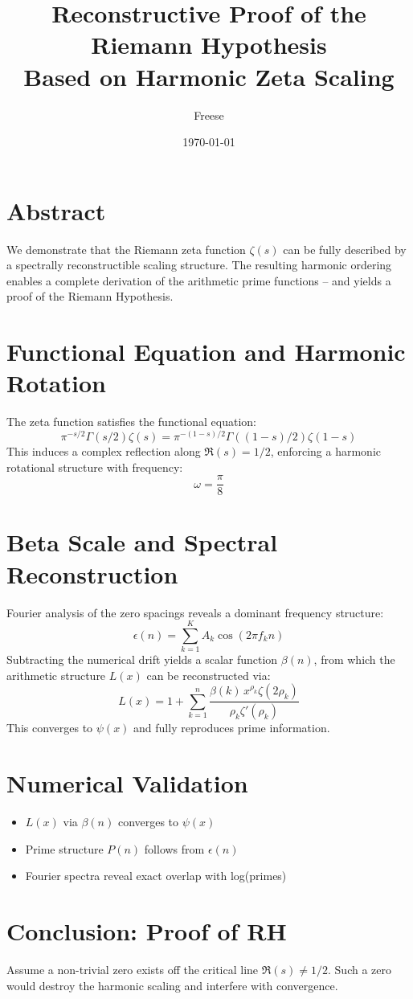 \documentclass[12pt]{article}
\title{\textbf{Reconstructive Proof of the Riemann Hypothesis\\[0.2cm]
Based on Harmonic Zeta Scaling}}
\author{Freese}
\date{\today}
\begin{document}
\maketitle

\section*{Abstract}
We demonstrate that the Riemann zeta function $\zeta(s)$ can be fully described by a spectrally reconstructible scaling structure.  
The resulting harmonic ordering enables a complete derivation of the arithmetic prime functions – and yields a proof of the Riemann Hypothesis.

\section{Functional Equation and Harmonic Rotation}
The zeta function satisfies the functional equation:
\[
\pi^{-s/2} \Gamma(s/2)\zeta(s) = \pi^{-(1-s)/2} \Gamma((1-s)/2)\zeta(1-s)
\]
This induces a complex reflection along $\Re(s) = 1/2$, enforcing a harmonic rotational structure with frequency:
\[
\omega = \frac{\pi}{8}
\]

\section{Beta Scale and Spectral Reconstruction}
Fourier analysis of the zero spacings reveals a dominant frequency structure:
\[
\epsilon(n) = \sum_{k=1}^{K} A_k \cos(2\pi f_k n)
\]
Subtracting the numerical drift yields a scalar function $\beta(n)$, from which the arithmetic structure $L(x)$ can be reconstructed via:
\[
L(x) = 1 + \sum_{k=1}^{n} \frac{\beta(k)\,x^{\rho_k} \zeta(2\rho_k)}{\rho_k \zeta'(\rho_k)}
\]
This converges to $\psi(x)$ and fully reproduces prime information.

\section{Numerical Validation}
\begin{itemize}
  \item $L(x)$ via $\beta(n)$ converges to $\psi(x)$
  \item Prime structure $P(n)$ follows from $\epsilon(n)$
  \item Fourier spectra reveal exact overlap with log(primes)
\end{itemize}

\section{Conclusion: Proof of RH}
Assume a non-trivial zero exists off the critical line $\Re(s) \ne 1/2$.  
Such a zero would destroy the harmonic scaling and interfere with convergence.
\end{document}
